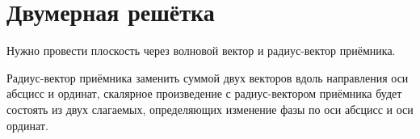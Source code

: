 \section{Двумерная решётка}

Нужно провести плоскость через волновой вектор и радиус-вектор приёмника.

Радиус-вектор приёмника заменить суммой двух векторов вдоль направления оси абсцисс и ординат, скалярное произведение с радиус-вектором приёмника будет состоять
из двух слагаемых, определяющих изменение фазы по оси абсцисс и оси ординат.


